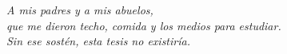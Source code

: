 \chapter*{}
\vspace*{\fill}
\begin{flushright}
  \textit{A mis padres y a mis abuelos,\\
  que me dieron techo, comida y los medios para estudiar.\\
  Sin ese sostén, esta tesis no existiría.}
\end{flushright}
\vspace*{\fill}
